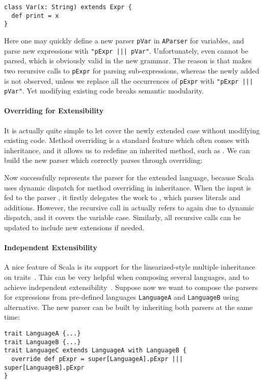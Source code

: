 \begin{lstlisting}
class Var(x: String) extends Expr {
  def print = x
}
\end{lstlisting}
Here one may quickly define a new parser \lstinline|pVar| in \lstinline|AParser| for variables, and parse new expressions
with \lstinline{"pExpr ||| pVar"}.
Unfortunately, even  cannot be parsed, which is obviously valid in the new grammar.
The reason is that  makes two recursive calls to \lstinline|pExpr| for parsing sub-expressions, whereas the newly added  is not observed, unless we replace all the occurrences of \lstinline|pExpr| with \lstinline{"pExpr ||| pVar"}.
Yet modifying existing code breaks semantic modularity.

\vspace{-.05in}
\paragraph{Overriding for Extensibility}
It is actually quite simple to let  cover the newly
extended case without modifying existing code. Method overriding is a
standard feature which often comes with inheritance, and it allows us
to redefine an inherited method, such as . We can
build the new parser which correctly parses 
through overriding:


Now  successfully represents the parser for the extended language, because Scala uses dynamic dispatch for
method overriding in inheritance. When the input  is fed to the parser , it firstly delegates
the work to , which parses literals and additions. However, the recursive call  in 
actually refers to  again due to dynamic dispatch, and it covers the variable case. Similarly, all recursive calls can be updated to include new extensions if needed.

\vspace{-.05in}
\paragraph{Independent Extensibility}
A nice feature of Scala is its support for the linearized-style multiple
inheritance on traits~\cite{odersky2004overview}. This can be very helpful when
composing several languages, and to achieve independent
extensibility~\cite{odersky2005independently}. Suppose now we want to compose the parsers
for expressions from pre-defined languages \lstinline|LanguageA| and \lstinline|LanguageB| using alternative.
The new parser can be built by inheriting both parsers at the same time:
\begin{lstlisting}
trait LanguageA {...}
trait LanguageB {...}
trait LanguageC extends LanguageA with LanguageB {
  override def pExpr = super[LanguageA].pExpr ||| super[LanguageB].pExpr
}
\end{lstlisting}


